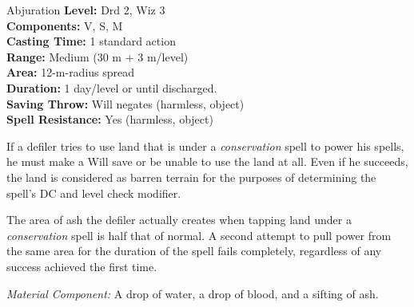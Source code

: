 {Abjuration}
{
	\textbf{Level:}
	Drd 2, Wiz 3 \\
	\textbf{Components:}
	V, S, M \\
	\textbf{Casting Time:}
	1 standard action \\
	\textbf{Range:}
	Medium (30 m + 3 m/level) \\
	\textbf{Area:}
	12-m-radius spread \\
	\textbf{Duration:}
	1 day/level or until discharged. \\
	\textbf{Saving Throw:}
	Will negates (harmless, object) \\
	\textbf{Spell Resistance:}
	Yes (harmless, object) \\
}
{
	If a defiler tries to use land that is under a \emph{conservation} spell to power his spells, he must make a Will save or be unable to use the land at all. Even if he succeeds, the land is considered as barren terrain for the purposes of determining the spell's DC and level check modifier.

	The area of ash the defiler actually creates when tapping land under a \emph{conservation} spell is half that of normal. A second attempt to pull power from the same area for the duration of the spell fails completely, regardless of any success achieved the first time.

	\textit{Material Component:} A drop of water, a drop of blood, and a sifting of ash.
}
